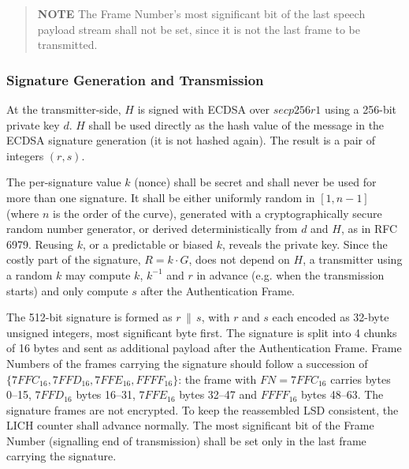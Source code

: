 \documentclass[a4paper,11pt,oneside]{book}
\begin{document}
\begin{quote}
	\textbf{NOTE} The Frame Number's most significant bit of the last speech payload stream shall not be set, since it is not the last frame to be transmitted.
\end{quote}

\subsubsection{Signature Generation and Transmission}
At the transmitter-side, $H$ is signed with ECDSA over $secp256r1$ using a 256-bit private key $d$. $H$ shall be used directly as the hash value of the message in the ECDSA signature generation (it is not hashed again). The result is a pair of integers $(r, s)$.

The per-signature value $k$ (nonce) shall be secret and shall never be used for more than one signature. It shall be either uniformly random in $[1, n-1]$ (where $n$ is the order of the curve), generated with a cryptographically secure random number generator, or derived deterministically from $d$ and $H$, as in RFC 6979. Reusing $k$, or a predictable or biased $k$, reveals the private key. Since the costly part of the signature, $R = k \cdot G$, does not depend on $H$, a transmitter using a random $k$ may compute $k$, $k^{-1}$ and $r$ in advance (e.g. when the transmission starts) and only compute $s$ after the Authentication Frame.

The 512-bit signature is formed as $r \,\|\, s$, with $r$ and $s$ each encoded as 32-byte unsigned integers, most significant byte first. The signature is split into 4 chunks of 16 bytes and sent as additional payload after the Authentication Frame. Frame Numbers of the frames carrying the signature should follow a succession of $\{7FFC_{16}, 7FFD_{16}, 7FFE_{16}, FFFF_{16}\}$: the frame with $FN = 7FFC_{16}$ carries bytes 0--15, $7FFD_{16}$ bytes 16--31, $7FFE_{16}$ bytes 32--47 and $FFFF_{16}$ bytes 48--63. The signature frames are not encrypted. To keep the reassembled LSD consistent, the LICH counter shall advance normally. The most significant bit of the Frame Number (signalling end of transmission) shall be set only in the last frame carrying the signature.
\end{document}
